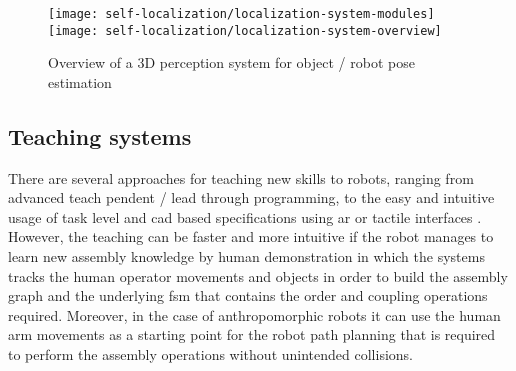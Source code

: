 \begin{figure}[H]
	\centering
	\texttt{[image: self-localization/localization-system-modules]}
	\texttt{[image: self-localization/localization-system-overview]}
	\caption[Overview of a 3D perception system for object / robot pose estimation]{Overview of a 3D perception system for object / robot pose estimation \cite{Costa2016Elsevier}}
	\label{fig:localization-system}
\end{figure}



\subsection{Teaching systems}

There are several approaches for teaching new skills to robots, ranging from advanced teach pendent / lead through programming, to the easy and intuitive usage of task level and \gls{cad} based specifications using \gls{ar} or tactile interfaces \cite{Perzylo2015a}. However, the teaching can be faster and more intuitive if the robot manages to learn new assembly knowledge \cite{tensorflow} by human demonstration \cite{Argall2009,Hamabe2015,Wang2015} in which the systems tracks the human operator movements and objects in order to build the assembly graph and the underlying \gls{fsm} that contains the order and coupling operations required. Moreover, in the case of anthropomorphic robots it can use the human arm movements as a starting point for the robot path planning \cite{Zanchettin2012} that is required to perform the assembly operations without unintended collisions.






